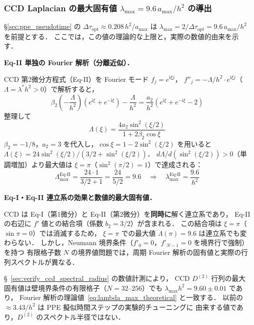 \subsubsection*{CCD Laplacian の最大固有値 \texorpdfstring{$\lambda_{\max} = 9.6\,a_{\max}/h^2$}{λ\_max = 9.6 a\_max/h²} の導出}
\label{sec:lambda_max_derive}

§\ref{sec:ppe_pseudotime} の $\Delta\tau_{\mathrm{opt}} \approx 0.208\,h^2/a_{\max}$ は
$\lambda_{\max} = 2/\Delta\tau_{\mathrm{opt}} = 9.6\,a_{\max}/h^2$ を前提とする．
ここでは，この値の理論的な上限と，実際の数値的由来を示す．

\medskip
\noindent\textbf{Eq-II 単独の Fourier 解析（分離近似）．}

CCD 第2微分方程式（Eq-II）を Fourier モード $f_j = e^{\mathrm{i}\xi j}$，
$f''_j = -\Lambda/h^2 \cdot e^{\mathrm{i}\xi j}$（$\Lambda = \lambda^* h^2 > 0$）で解析すると，
\[
  \beta_2\!\left(-\frac{\Lambda}{h^2}\right)\!(e^{\mathrm{i}\xi}+e^{-\mathrm{i}\xi})
  - \frac{\Lambda}{h^2}
  = \frac{a_2}{h^2}(e^{\mathrm{i}\xi}+e^{-\mathrm{i}\xi}-2)
\]
整理して
\begin{equation}
  \Lambda(\xi) = \frac{4a_2 \sin^2(\xi/2)}{1 + 2\beta_2 \cos\xi}
  \label{eq:lambda_fourier}
\end{equation}
$\beta_2=-1/8$，$a_2=3$ を代入し，$\cos\xi = 1-2\sin^2(\xi/2)$ を用いると
$\Lambda(\xi) = 24\sin^2(\xi/2)/(3/2 + \sin^2(\xi/2))$．
$d\Lambda/d(\sin^2(\xi/2)) > 0$（単調増加）より最大値は $\xi=\pi$（$\sin^2(\pi/2)=1$）で達成される：
\begin{equation}
  \Lambda_{\max}^{\mathrm{Eq\text{-}II}} = \frac{24\cdot 1}{3/2 + 1} = \frac{24}{5/2} = 9.6
  \quad\Longrightarrow\quad
  \lambda_{\max}^{\mathrm{Eq\text{-}II}} = \frac{9.6}{h^2}
  \label{eq:lambda_max_theoretical}
\end{equation}

\medskip
\noindent\textbf{Eq-I・Eq-II 連立系の効果と数値的最大固有値．}

CCD は Eq-I（第1微分）と Eq-II（第2微分）を\textbf{同時に}解く連立系であり，
Eq-II の右辺に $f'$ 値との結合項（係数 $b_2=3/2$）が含まれる．
この結合項は $\xi=\pi$（$\sin\pi=0$）では消滅するため，
$\xi=\pi$ での最大値 $\Lambda(\pi)=9.6$ は連立系でも変わらない．
しかし，Neumann 境界条件（$f'_0=0$，$f'_{N-1}=0$ を境界行で強制）を持つ
有限格子数 $N$ の境界値問題では，周期 Fourier 解析の固有値と実際の行列スペクトルが異なる．

§~\ref{sec:verify_ccd_spectral_radius} の数値計測により，
CCD $D^{(2)}$ 行列の最大固有値は壁境界条件の有限格子（$N = 32$--$256$）でも
$\lambda_{\max} h^2 = 9.60 \pm 0.01$ であり，
Fourier 解析の理論値~\eqref{eq:lambda_max_theoretical} と一致する．
以前の $\approx 3.43/h^2$ は PPE 擬似時間ステップの実験的チューニングに
由来する値であり，$D^{(2)}$ のスペクトル半径ではない．

